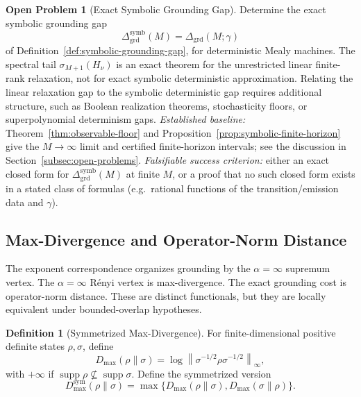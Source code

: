 \documentclass[12pt]{article}
\theoremstyle{definition}
\newtheorem{definition}[theorem]{Definition}
\newtheorem{openproblem}[theorem]{Open Problem}
\DeclareMathOperator{\supp}{supp}
\newcommand{\Dmax}{D_{\max}}
\newcommand{\Dmaxsym}{D_{\max}^{\mathrm{sym}}}
\begin{document}
\begin{openproblem}[Exact Symbolic Grounding Gap]
\label{open:symbolic-grounding}
Determine the exact symbolic grounding gap
\[
\Delta_{\mathrm{grd}}^{\mathrm{symb}}(M)
=
\Delta_{\mathrm{grd}}(M;\gamma)
\]
of Definition~\ref{def:symbolic-grounding-gap}, for deterministic Mealy
machines.  The spectral tail
$\sigma_{M+1}(H_\nu)$ is an exact theorem for the unrestricted linear
finite-rank relaxation, not for exact symbolic deterministic approximation.
Relating the linear relaxation gap to the symbolic deterministic gap requires
additional structure, such as Boolean realization theorems, stochasticity
floors, or superpolynomial determinism gaps.  \emph{Established baseline:}
Theorem~\ref{thm:observable-floor} and
Proposition~\ref{prop:symbolic-finite-horizon} give the $M\to\infty$ limit and
certified finite-horizon intervals; see the discussion in
Section~\ref{subsec:open-problems}.  \emph{Falsifiable success criterion:}
either an exact closed form for $\Delta_{\mathrm{grd}}^{\mathrm{symb}}(M)$ at
finite $M$, or a proof that no such closed form exists in a stated class of
formulas (e.g.\ rational functions of the transition/emission data and
$\gamma$).
\end{openproblem}

\subsection{Max-Divergence and Operator-Norm Distance}
\label{subsec:grounding-maxdiv}

The exponent correspondence organizes grounding by the $\alpha=\infty$
supremum vertex.  The $\alpha=\infty$ R\'enyi vertex is max-divergence.  The
exact grounding cost is operator-norm distance.  These are distinct
functionals, but they are locally equivalent under bounded-overlap hypotheses.

\begin{definition}[Symmetrized Max-Divergence]
\label{def:dmax}
For finite-dimensional positive definite states $\rho,\sigma$, define
\[
\Dmax(\rho\|\sigma)
=
\log
\left\|
\sigma^{-1/2}\rho\sigma^{-1/2}
\right\|_\infty,
\]
with $+\infty$ if $\supp\rho\not\subseteq\supp\sigma$.
Define the symmetrized version
\[
\Dmaxsym(\rho\|\sigma)
=
\max\{
\Dmax(\rho\|\sigma),
\Dmax(\sigma\|\rho)
\}.
\]
\end{definition}
\end{document}

